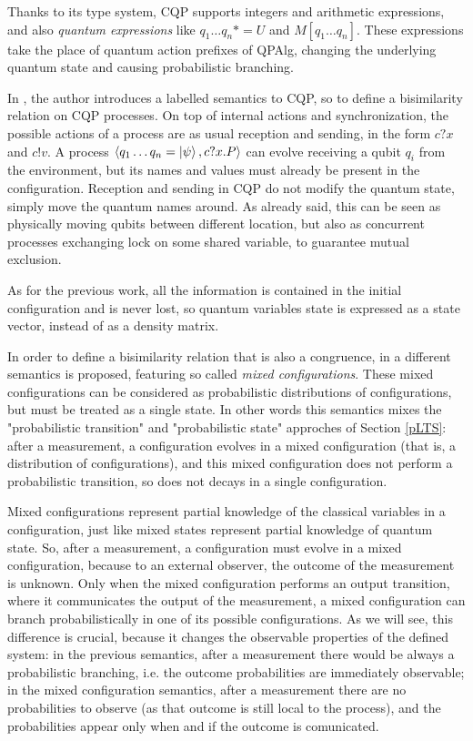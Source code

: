 Thanks to its type system, CQP supports integers and arithmetic expressions, and also \textit{quantum expressions} like $q_1\ldots q_n *= U$ and $M[q_1 \ldots q_n]$. These expressions take the place of quantum action prefixes of QPAlg, changing the underlying quantum state and causing probabilistic branching.
 

In \cite{davidsonFormalVerificationTechniques2012}, the author introduces a labelled semantics  to CQP, so to define a bisimilarity relation on CQP processes. On top of internal actions and synchronization, the possible actions of a process are as usual reception and sending, in the form $c?x$ and $c!v$. A process $\langle q_1 \ldots q_n = \ket{\psi}, c?x.P\rangle$ can evolve receiving a qubit $q_i$ from the environment, but its names and values must already be present in the configuration. Reception and sending in CQP do not modify the quantum state, simply move the quantum names around. As already said, this can be seen as physically moving qubits between different location, but also as concurrent processes exchanging lock on some shared variable, to guarantee mutual exclusion.


As for the previous work, all the information is contained in the initial configuration and is never lost, so quantum variables state is expressed as a state vector, instead of as a density matrix.



In order to define a bisimilarity relation that is also a congruence, in \cite{davidsonFormalVerificationTechniques2012} a different semantics is proposed, featuring so called \textit{mixed configurations}. These mixed configurations can be considered as probabilistic distributions of configurations, but must be treated as a single state. In other words this semantics mixes the "probabilistic transition" and "probabilistic state" approches of Section \ref{pLTS}: after a measurement, a configuration evolves in a mixed configuration (that is, a distribution of configurations), and this mixed configuration does not perform a probabilistic transition, so does not decays in a single configuration. 

Mixed configurations represent partial knowledge of the classical variables in a configuration, just like mixed states represent partial knowledge of quantum state. So, after a measurement, a configuration must evolve in a mixed configuration, because to an external observer, the outcome of the measurement is unknown. Only when the mixed configuration performs an output transition, where it communicates the output of the measurement, a mixed configuration can branch probabilistically in one of its possible configurations. As we will see, this difference is crucial, because it changes the observable properties of the defined system: in the previous semantics, after a measurement there would be always a probabilistic branching, i.e. the outcome probabilities are immediately observable; in the mixed configuration semantics, after a measurement there are no probabilities to observe (as that outcome is still local to the process), and the probabilities appear only when and if the outcome is comunicated.

